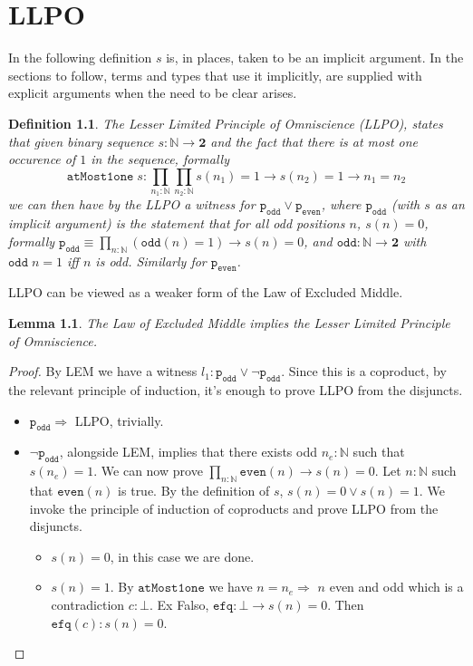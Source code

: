 \documentclass[12pt]{report}
\newtheorem{defn}[thm]{Definition}
\newtheorem{lem}[thm]{Lemma}
\begin{document}
\chapter{LLPO}
In the following definition $s$ is, in places, taken to be an implicit argument. 
In the sections to follow, terms and types that use it implicitly, are supplied with explicit arguments when the need to be clear arises. 
\begin{defn}\label{LLPO}
The Lesser Limited Principle of Omniscience (LLPO), states that given binary sequence $s : \mathbb{N} \rightarrow \mathbf{2}$ and the fact that there is at most one occurence of $1$ in the sequence, formally 
$$\mathtt{atMost1one}\; s :\prod_{n_1 : \mathbb{N}} \prod_{n_2 : \mathbb{N}} s(n_1) = 1 \rightarrow s(n_2)= 1 \rightarrow n_1 = n_2$$
we can then have by the LLPO a witness for $\mathtt{p_{odd}} \vee \mathtt{p_{even}}$, where $\mathtt{p_{odd}}$ (with $s$ as an implicit argument) is the statement that for all odd positions $n$, $s(n) = 0$, formally $\mathtt{p_{odd}} \equiv \prod_{n : \mathbb{N}} (\mathtt{odd}(n) = 1) \rightarrow s(n) = 0$, and $\mathtt{odd} : \mathbb{N}\rightarrow \mathbf{2}$ with $\mathtt{odd}\; n = 1$ iff $n$ is odd. 
Similarly for $\mathtt{p_{even}}$. 
\end{defn}
LLPO can be viewed as a weaker form of the Law of Excluded Middle. 

\begin{lem} 
The Law of Excluded Middle implies the Lesser Limited Principle of Omniscience.
\end{lem}

\begin{proof}
By LEM we have a witness $ l_1 :\mathtt{p_{odd}} \vee \neg \mathtt{p_{odd}}$. 
Since this is a coproduct, by the relevant principle of induction, it's enough to prove LLPO from the disjuncts. 
\begin{itemize}
	\item $\mathtt{p_{odd}} \Rightarrow $ LLPO, trivially.

	\item $\neg \mathtt{p_{odd}}$, alongside LEM, implies that there exists odd $n_e : \mathbb{N}$ such that $s(n_e) = 1$. 
	We can now prove $\prod_{n : \mathbb{N}} \mathtt{even}(n) \rightarrow s(n) = 0$. 
	Let $n : \mathbb{N}$ such that $\mathtt{even}(n)$ is true. 
	By the definition of $s$, $s(n) = 0 \vee s(n) = 1$.
	We invoke the principle of induction of coproducts and prove LLPO from the disjuncts. 
	\begin{itemize}
		\item $s(n) = 0$, in this case we are done.
		\item $s(n) = 1$. 
		By $\mathtt{atMost1one}$ we have $n = n_e \Rightarrow $ $n$ even and odd which is a contradiction $c : \bot$. 
		Ex Falso,  $\mathtt{efq} : \bot \rightarrow s(n) = 0$. 
		Then $\mathtt{efq}(c) : s(n) = 0$.
	\end{itemize}
\end{itemize}
\end{proof}
\end{document}
